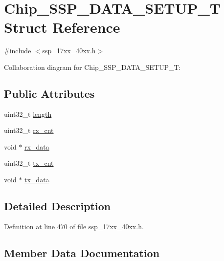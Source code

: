 \hypertarget{structChip__SSP__DATA__SETUP__T}{}\section{Chip\+\_\+\+S\+S\+P\+\_\+\+D\+A\+T\+A\+\_\+\+S\+E\+T\+U\+P\+\_\+T Struct Reference}
\label{structChip__SSP__DATA__SETUP__T}


{\ttfamily \#include $<$ssp\+\_\+17xx\+\_\+40xx.\+h$>$}



Collaboration diagram for Chip\+\_\+\+S\+S\+P\+\_\+\+D\+A\+T\+A\+\_\+\+S\+E\+T\+U\+P\+\_\+T\+:
\subsection*{Public Attributes}
\begin{DoxyCompactItemize}
\item 
uint32\+\_\+t \hyperlink{structChip__SSP__DATA__SETUP__T_ac5202ff04a3ed639dce258e31a9000d6}{length}
\item 
uint32\+\_\+t \hyperlink{structChip__SSP__DATA__SETUP__T_a74d6f8529c17e5e1ce7e78cdeb1a39b4}{rx\+\_\+cnt}
\item 
void $\ast$ \hyperlink{structChip__SSP__DATA__SETUP__T_a06371dd1c78e3cb326a2ccc2811f0346}{rx\+\_\+data}
\item 
uint32\+\_\+t \hyperlink{structChip__SSP__DATA__SETUP__T_ab37848675426612b2fd0e986dbd2d260}{tx\+\_\+cnt}
\item 
void $\ast$ \hyperlink{structChip__SSP__DATA__SETUP__T_a490e82f2648097f22faa108b59d89848}{tx\+\_\+data}
\end{DoxyCompactItemize}


\subsection{Detailed Description}


Definition at line 470 of file ssp\+\_\+17xx\+\_\+40xx.\+h.



\subsection{Member Data Documentation}
